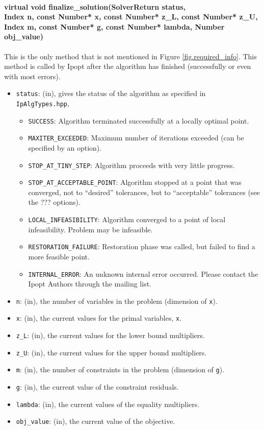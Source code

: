 \documentclass[letter,10pt]{article}
\begin{document}
{\paragraph{virtual void finalize\_solution(SolverReturn status,\\
    Index n, const Number* x, const Number* z\_L, const Number* z\_U, \\
    Index m, const Number* g, const Number* lambda, Number obj\_value)}
$\;$ \\
This is the only method that is not mentioned in Figure
\ref{fig.required_info}. This method is called by Ipopt after the
algorithm has finished (successfully or even with most errors).
\begin{itemize}
\item {\tt status}: (in), gives the status of the algorithm 
        as specified in {\tt IpAlgTypes.hpp},
        \begin{itemize}
        \item {\tt SUCCESS}: Algorithm terminated successfully 
        at a locally optimal point.
        \item {\tt MAXITER\_EXCEEDED}: Maximum number of iterations 
        exceeded (can be specified by an option).
        \item {\tt STOP\_AT\_TINY\_STEP}: Algorithm proceeds with very little
        progress. 
        \item {\tt STOP\_AT\_ACCEPTABLE\_POINT}: Algorithm stopped at a point
        that was converged, not to ``desired'' tolerances, 
        but to ``acceptable'' tolerances (see the ??? options).
        \item {\tt LOCAL\_INFEASIBILITY}: Algorithm converged to a point 
        of local infeasibility. Problem may be infeasible.
        \item {\tt RESTORATION\_FAILURE}: Restoration phase was called, but 
        failed to find a more feasible point.
        \item {\tt INTERNAL\_ERROR}: An unknown internal error occurred. Please
        contact the Ipopt Authors through the mailing list.
        \end{itemize}
\item {\tt n}: (in), the number of variables in the problem (dimension of {\tt x}). 
\item {\tt x}: (in), the current values for the primal variables, {\tt x}.
\item {\tt z\_L}: (in), the current values for the lower bound multipliers.
\item {\tt z\_U}: (in), the current values for the upper bound multipliers.
\item {\tt m}: (in), the number of constraints in the problem (dimension of {\tt g}).
\item {\tt g}: (in), the current value of the constraint residuals.
\item {\tt lambda}: (in), the current values of the equality multipliers.
\item {\tt obj\_value}: (in), the current value of the objective.
\end{itemize}

}
\end{document}
